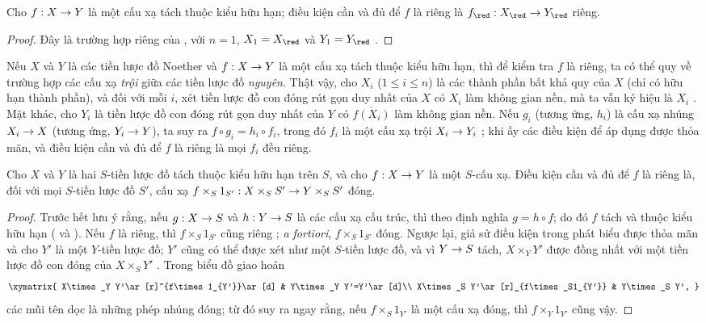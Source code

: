 \documentclass[oneside,10pt]{amsart}
\makeatletter
\renewcommand{\leq}{\leqslant}
\newcommand{\ega@arrow}[2]{\mathchoice{#1}{#2}{#2}{#2}}
\renewcommand{\to}{\ega@arrow{\longrightarrow}{\rightarrow}}
\let\EGAOriginalLabel\label
\renewcommand{\label}[1]{\phantomsection\EGAOriginalLabel{#1}}
\makeatother
\begin{document}
\begin{corollary}[5.4.6]
\label{II.5.4.6}
Cho $f:X\to Y$ là một cấu xạ tách thuộc kiểu hữu hạn; điều kiện cần và đủ để $f$ là riêng là $f_\red:X_\red\to Y_\red$ riêng.
\end{corollary}

\begin{proof}
Đây là trường hợp riêng của , với $n=1$, $X_1=X_\red$ và $Y_1=Y_\red$ .
\end{proof}

\begin{env}[5.4.7]
\label{II.5.4.7}
Nếu $X$ và $Y$ là các tiền lược đồ Noether và $f:X\to Y$ là một cấu xạ tách thuộc kiểu hữu hạn, thì để kiểm tra $f$ là riêng, ta có thể quy về trường hợp các cấu xạ \emph{trội} giữa các tiền lược đồ \emph{nguyên}.
Thật vậy, cho $X_i$ ($1\leq i\leq n$) là các thành phần bất khả quy của $X$ (chỉ có hữu hạn thành phần), và đối với mỗi $i$, xét tiền lược đồ con đóng rút gọn duy nhất của $X$ có $X_i$ làm không gian nền, mà ta vẫn ký hiệu là $X_i$ .
Mặt khác, cho $Y_i$ là tiền lược đồ con đóng rút gọn duy nhất của $Y$ có $\overline{f(X_i)}$ làm không gian nền.
Nếu $g_i$ (tương ứng, $h_i$) là cấu xạ nhúng $X_i\to X$ (tương ứng, $Y_i\to Y$), ta suy ra $f\circ g_i=h_i\circ f_i$, trong đó $f_i$ là một cấu xạ trội $X_i\to Y_i$ ;
khi ấy các điều kiện để áp dụng  được thỏa mãn, và điều kiện cần và đủ để $f$ là riêng là mọi $f_i$ đều riêng.
\end{env}

\begin{corollary}[5.4.8]
\label{II.5.4.8}
Cho $X$ và $Y$ là hai $S$-tiền lược đồ tách thuộc kiểu hữu hạn trên $S$, và cho $f:X\to Y$ là một $S$-cấu xạ.
Điều kiện cần và đủ để $f$ là riêng là, đối với mọi $S$-tiền lược đồ $S'$, cấu xạ $f\times_S 1_{S'}:X\times_S S'\to Y\times_S S'$ đóng.
\end{corollary}

\begin{proof}
Trước hết lưu ý rằng, nếu $g:X\to S$ và $h:Y\to S$ là các cấu xạ cấu trúc, thì theo định nghĩa $g=h\circ f$; do đó $f$ tách và thuộc kiểu hữu hạn ( và ).
Nếu $f$ là riêng, thì $f\times_S 1_{S'}$ cũng riêng ; \emph{a fortiori}, $f\times_S 1_{S'}$ đóng.
Ngược lại, giả sử điều kiện trong phát biểu được thỏa mãn và cho $Y'$ là một $Y$-tiền lược đồ;
$Y'$ cũng có thể được xét như một $S$-tiền lược đồ, và vì $Y\to S$ tách, $X\times_Y Y'$ được đồng nhất với một tiền lược đồ con đóng của $X\times_S Y'$ .
Trong biểu đồ giao hoán
\[
  \xymatrix{
    X\times_Y Y'\ar[r]^{f\times1_{Y'}}\ar[d] &
    Y\times_Y Y'=Y'\ar[d]\\
    X\times_S Y'\ar[r]_{f\times_S1_{Y'}} &
    Y\times_S Y',
  }
\]
các mũi tên dọc là những phép nhúng đóng; từ đó suy ra ngay rằng, nếu $f\times_S1_{Y'}$ là một cấu xạ đóng, thì $f\times_Y1_{Y'}$ cũng vậy.
\end{proof}
\end{document}
